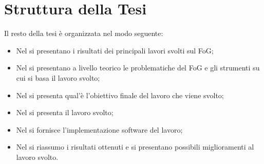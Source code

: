 
\section{Struttura della Tesi}\label{cap1:Struttura della Tesi}
Il resto della tesi è organizzata nel modo seguente:
\begin{itemize}
	\item Nel \textbf{} si presentano i risultati dei principali lavori svolti sul FoG;
	\item  Nel \textbf{} si presentano a livello teorico le problematiche del FoG e gli strumenti su cui si basa il lavoro svolto;
	\item Nel \textbf{} si presenta qual'è l'obiettivo finale del lavoro che viene svolto;
	\item Nel \textbf{} si presenta il lavoro svolto;
	\item Nel \textbf{} si fornisce l'implementazione software del lavoro;
	\item Nel \textbf{} si riassumo i risultati ottenuti e si presentano possibili miglioramenti al lavoro svolto.
\end{itemize}
 